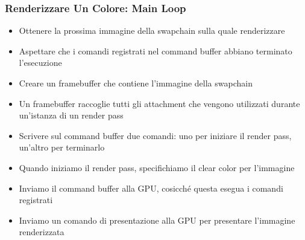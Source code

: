 \begin{frame}
\frametitle{Renderizzare Un Colore: Main Loop}

\begin{itemize}
\item Ottenere la prossima immagine della swapchain sulla quale renderizzare
\item Aspettare che i comandi registrati nel command buffer abbiano terminato l'esecuzione
\item Creare un framebuffer che contiene l'immagine della swapchain
\item Un framebuffer raccoglie tutti gli attachment che vengono utilizzati durante un'istanza di un render pass
\item Scrivere sul command buffer due comandi: uno per iniziare il render pass, un'altro per terminarlo
\item Quando iniziamo il render pass, specifichiamo il clear color per l'immagine
\item Inviamo il command buffer alla GPU, cosicché questa esegua i comandi registrati
\item Inviamo un comando di presentazione alla GPU per presentare l'immagine renderizzata
\end{itemize}

\end{frame}
